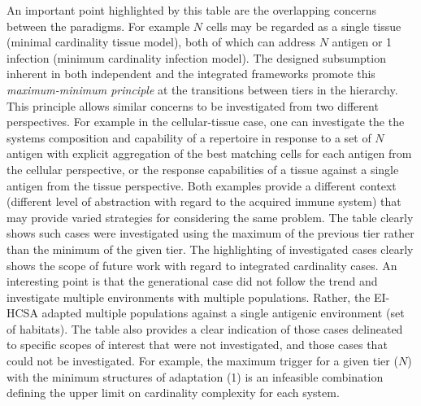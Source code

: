 An important point highlighted by this table are the overlapping concerns between the paradigms. For example $N$ cells may be regarded as a single tissue (minimal cardinality tissue model), both of which can address $N$ antigen or 1 infection (minimum cardinality infection model). The designed subsumption inherent in both independent and the integrated frameworks promote this \emph{maximum-minimum principle} at the transitions between tiers in the hierarchy. This principle allows similar concerns to be investigated from two different perspectives. For example in the cellular-tissue case, one can investigate the the systems composition and capability of a repertoire in response to a set of $N$ antigen with explicit aggregation of the best matching cells for each antigen from the cellular perspective, or the response capabilities of a tissue against a single antigen from the tissue perspective. Both examples provide a different context (different level of abstraction with regard to the acquired immune system) that may provide varied strategies for considering the same problem. The table clearly shows such cases were investigated using the maximum of the previous tier rather than the minimum of the given tier. 
The highlighting of investigated cases clearly shows the scope of future work with regard to integrated cardinality cases. An interesting point is that the generational case did not follow the trend and investigate multiple environments with multiple populations. Rather, the EI-HCSA adapted multiple populations against a single antigenic environment (set of habitats). 
The table also provides a clear indication of those cases delineated to specific scopes of interest that were not investigated, and those cases that could not be investigated. For example, the maximum trigger for a given tier ($N$) with the minimum structures of adaptation (1) is an infeasible combination defining the upper limit on cardinality complexity for each system.

